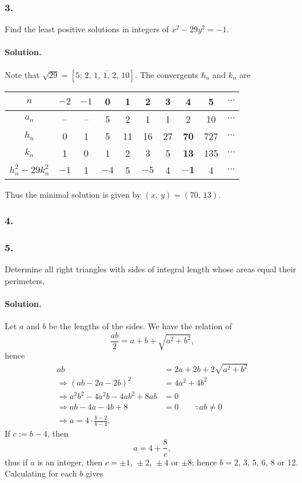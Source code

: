 \subsubsection{3.} Find the least positive solutions in integers of $x^2-29y^2=-1$.

\paragraph{Solution.} Note that $\sqrt{29}=\left[5;\,\overline{2,\,1,\,1,\,2,\,10}\right]$. The convergents $h_n$ and $k_n$ are

\begin{center}
    \begin{tabular}{c|ccccccccc}
    \hline
    $n$ & $-2$ & $-1$ & 0 & 1 & 2 & 3 & 4 & 5 & $\cdots$ \\
    \hline
    $a_n$ & -- & -- & 5 & 2  & 1  & 1  & 2  & 10 & $\cdots$ \\
    \hline
    $h_n$ & 0  & 1  & 5 & 11 & 16 & 27 & \textbf{70} & 727 & $\cdots$ \\
    $k_n$ & 1  & 0  & 1 & 2  & 3  & 5  & \textbf{13} & 135 & $\cdots$ \\
    \hline
    $h_n^2-29k_n^2$ & $-1$ & 1 & $-4$ & 5 & $-5$ & 4 & $\mathbf{-1}$ & 4 & $\cdots$ \\
    \hline
    \end{tabular}
\end{center}

Thus the minimal solution is given by $\left(x,\,y\right)=\left(70,\,13\right)$.

\subsubsection{4.}

\subsubsection{5.} Determine all right triangles with sides of integral length whose areas equal their perimeters.

\paragraph{Solution.} Let $a$ and $b$ be the lengths of the sides. We have the relation of
\[
    \frac{ab}{2}=a+b+\sqrt{a^2+b^2},
\]
hence
\begin{align*}
    ab &= 2a + 2b + 2\sqrt{a^2+b^2} \\
    \Rightarrow\left(ab-2a-2b\right)^2 &= 4a^2+4b^2 \\
    \Rightarrow a^2b^2-4a^2b-4ab^2+8ab &= 0 \\
    \Rightarrow ab - 4a - 4b + 8 &= 0 \qquad \because ab \neq 0 \\
    \Rightarrow a=4\cdot\frac{b-2}{b-4}.
\end{align*}
If $c:=b-4$, then
\[
    a=4+\frac{8}{c},
\]
thus if $a$ is an integer, then $c=\pm 1,\,\pm 2,\,\pm 4$ or $\pm 8$; hence
$b=2,\,3,\,5,\,6,\,8$ or 12. Calculating for each $b$ gives

